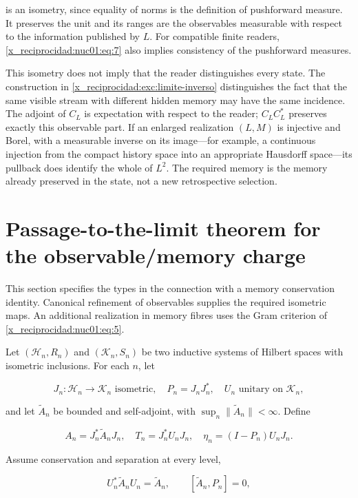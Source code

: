 is an isometry, since equality of norms is the definition of pushforward measure. It preserves the unit and its ranges are the observables measurable with respect to the information published by \(L\). For compatible finite readers, \eqref{x_reciprocidad:nuc01:eq:7} also implies consistency of the pushforward measures.

This isometry does not imply that the reader distinguishes every state. The construction in \cref{x_reciprocidad:exc:limite-inverso} distinguishes the fact that the same visible stream with different hidden memory may have the same incidence. The adjoint of \(C_L\) is expectation with respect to the reader; \(C_LC_L^*\) preserves exactly this observable part. If an enlarged realization \((L,M)\) is injective and Borel, with a measurable inverse on its image—for example, a continuous injection from the compact history space into an appropriate Hausdorff space—its pullback does identify the whole of \(L^2\). The required memory is the memory already preserved in the state, not a new retrospective selection.

\section{Passage-to-the-limit theorem for the observable/memory charge}

This section specifies the types in the connection with a memory conservation identity. Canonical refinement of observables supplies the required isometric maps. An additional realization in memory fibres uses the Gram criterion of \eqref{x_reciprocidad:nuc01:eq:5}.

Let \((\mathscr H_n,R_n)\) and \((\mathscr K_n,S_n)\) be two inductive systems of Hilbert spaces with isometric inclusions. For each \(n\), let

\[
J_n:\mathscr H_n\to\mathscr K_n\text{ isometric},\quad
P_n=J_nJ_n^*,\quad U_n\text{ unitary on }\mathscr K_n,
\]

and let \(\widetilde A_n\) be bounded and self-adjoint, with \(\sup_n\|\widetilde A_n\|<\infty\). Define

\[
A_n=J_n^*\widetilde A_nJ_n,\quad
T_n=J_n^*U_nJ_n,\quad
\eta_n=(I-P_n)U_nJ_n.
\]

Assume conservation and separation at every level,

\begin{equation}
U_n^*\widetilde A_nU_n=\widetilde A_n,
\qquad [\widetilde A_n,P_n]=0,
\label{x_reciprocidad:nuc01:eq:8}
\end{equation}

